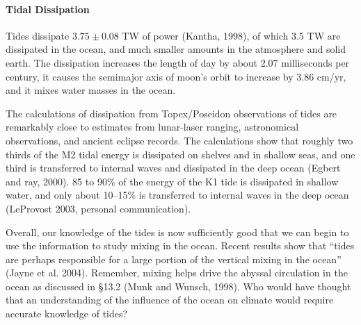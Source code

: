 \paragraph{Tidal Dissipation}
Tides dissipate $3.75\pm0.08$ TW of power (Kantha, 1998), of which 3.5 TW are dissipated in the ocean, and much smaller amounts in the atmosphere and solid earth. The dissipation increases the length of day by about 2.07 milliseconds per century, it causes the semimajor axis of moon's orbit to increase by 3.86 cm/yr, and it mixes water masses in the ocean.

The calculations of dissipation from Topex/Poseidon observations of tides are remarkably close to estimates from lunar-laser ranging, astronomical observations, and ancient eclipse records. The calculations show that roughly two thirds of the M2 tidal energy is dissipated on shelves and in shallow seas, and one third is  transferred to internal waves and dissipated in the deep ocean (Egbert and ray, 2000). 85 to 90\% of the energy of the K1 tide is dissipated in shallow water, and only about 10--15\% is transferred to internal waves in the deep ocean (LeProvost 2003, personal communication). 

Overall, our knowledge of the tides is now sufficiently good that we can begin to use the information to study mixing in the ocean. Recent results show that ``tides are perhaps responsible for a large portion of the vertical mixing in the ocean'' (Jayne et al. 2004). Remember, mixing helps drive the abyssal circulation in the ocean as discussed in \S 13.2 (Munk and Wunsch, 1998). Who would have thought that an understanding of the influence of the ocean on climate would require accurate knowledge of tides?

